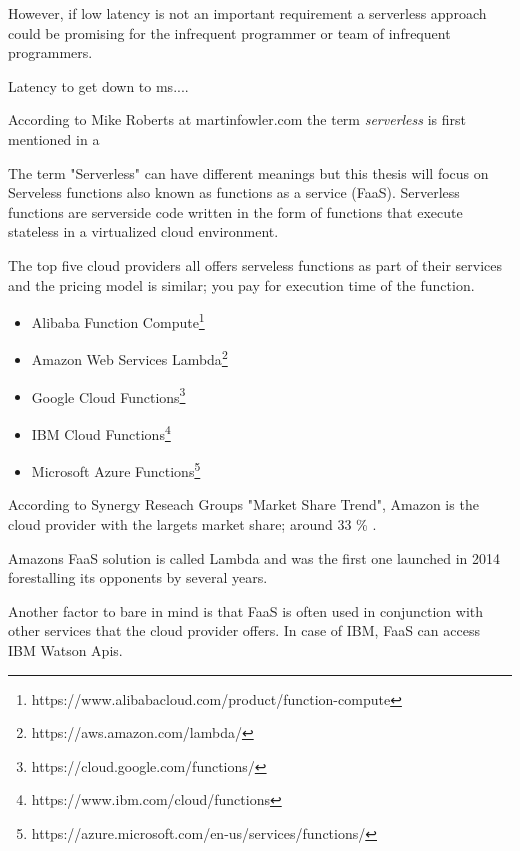 
However, if low latency is not an important requirement a serverless approach could be promising for the infrequent programmer or team of infrequent programmers. 


Latency to get down to ms....

According to Mike Roberts at martinfowler.com\cite{MikeRoberts2016} the term \textit{serverless} is first mentioned in a\cite{Fromm2012}

The term "Serverless" can have different meanings\cite{MikeRoberts2016} but this thesis will focus on Serveless functions also known as functions as a service (FaaS). Serverless functions are serverside code written in the form of functions that execute stateless in a virtualized cloud environment. 

The top five cloud providers\cite{SynergyResearchGroup} all offers serveless functions as part of their services and the pricing model is similar; you pay for execution time of the function.

\begin{itemize}
\item Alibaba Function Compute\footnote{https://www.alibabacloud.com/product/function-compute} %
\item Amazon Web Services Lambda\footnote{https://aws.amazon.com/lambda/} %
\item Google Cloud Functions\footnote{https://cloud.google.com/functions/} %
\item IBM Cloud Functions\footnote{https://www.ibm.com/cloud/functions}  %
\item Microsoft Azure Functions\footnote{https://azure.microsoft.com/en-us/services/functions/} %
\end{itemize}

According to Synergy Reseach Groups "Market Share Trend", Amazon is the cloud provider with the largets market share; around 33 \% \cite{SynergyResearchGroup}.

Amazons FaaS solution is called Lambda and was the first one launched in 2014 forestalling its opponents by several years. %

Another factor to bare in mind is that FaaS is often used in conjunction with other services that the cloud provider offers. In case of IBM, FaaS can access IBM Watson Apis.



